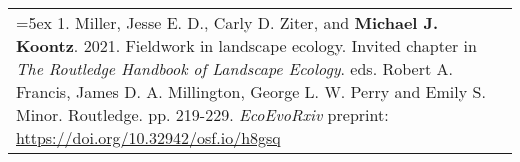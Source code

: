 \begin{longtable}{@{} >{\raggedright}p{6.10in} >{\raggedleft}X @{}}

\hangindent=5ex 1. Miller, Jesse E. D., Carly D. Ziter, and \textbf{Michael J. Koontz}. 2021. Fieldwork in landscape ecology. Invited chapter in \emph{The Routledge Handbook of Landscape Ecology}. eds. Robert A. Francis, James D. A. Millington, George L. W. Perry and Emily S. Minor. Routledge. pp. 219-229. \newline \emph{EcoEvoRxiv} preprint: \href{https://doi.org/10.32942/osf.io/h8gsq}{https://doi.org/10.32942/osf.io/h8gsq} & \tabularnewline

\end{longtable}
 